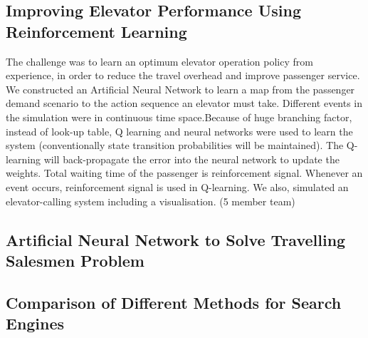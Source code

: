 \documentclass[11pt,a4paper]{moderncv}
\begin{document}
\subsection{Improving Elevator Performance Using Reinforcement Learning}
 {The challenge was to learn an optimum elevator operation policy from experience, in order to reduce the travel overhead and improve passenger service. We constructed an Artificial Neural Network to learn a map from the passenger demand scenario to the action sequence an elevator must take. 
Different events in the simulation were in continuous time space.Because of huge branching factor, instead of look-up table, Q learning and neural networks were used to learn the system (conventionally state transition probabilities will be maintained). The Q-learning will back-propagate the error into the neural network to update the weights. Total waiting time of the passenger is reinforcement signal. Whenever an event occurs, reinforcement signal is used in Q-learning. 
We also, simulated an elevator-calling system including a visualisation. (5 member team)}

\subsection{Artificial Neural Network to Solve Travelling Salesmen Problem}

\subsection{Comparison of Different Methods for Search Engines}
\end{document}
